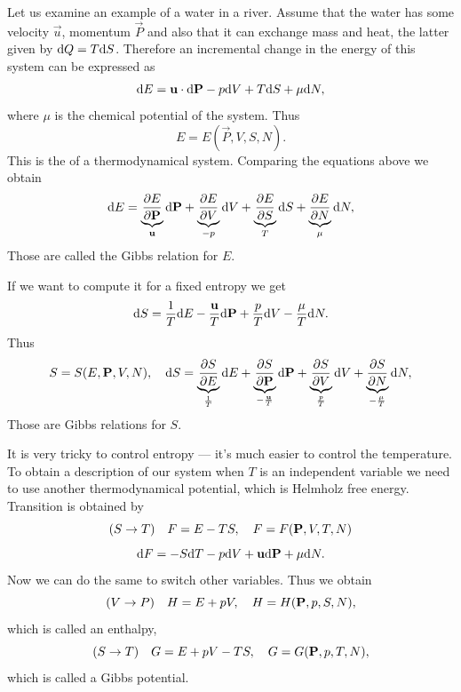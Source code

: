   Let us examine an example of a water in a river.
  Assume that the water has some velocity $\vec {u}$, momentum $\vec{P}$ and also that it can 
  exchange mass and heat, the latter given by $\mathrm{d} Q = T \mathrm{d} S$.
  Therefore an incremental change in the energy of this system can be expressed as
  \begin{displaymath}
    \mathrm{d} E = \mathbf{u} \cdot \mathrm{d} \mathbf{P} - p \mathrm{d} V + T \mathrm{d} S + \mu \mathrm{d} N,
  \end{displaymath}
  where $\mu$ is the chemical potential of the system.
  Thus
  \begin{displaymath}
    E = E(\vec P, V, S, N).
  \end{displaymath}
  This is the  of a thermodynamical system.
  Comparing the equations above we obtain
  \begin{displaymath}
    \mathrm{d} E = \underbrace{\frac{\partial E}{\partial \mathbf{P}}}_{\mathbf{u}} \mathrm{d} \mathbf{P} + \underbrace{\frac{\partial E}{\partial V}}_{- p} \mathrm{d} V 
    + \underbrace{\frac{\partial E}{\partial S}}_{T} \mathrm{d} S + \underbrace{\frac{\partial E}{\partial N}}_{\mu} \mathrm{d} N,
  \end{displaymath} %
  Those are called the Gibbs relation for $E$.

  If we want to compute it for a fixed entropy we get
  \begin{displaymath}
    \mathrm{d} S = \frac{1}{T} \mathrm{d} E - \frac{\mathbf{u}}{T} \mathrm{d} \mathbf{P} + \frac{p}{T} \mathrm{d} V - \frac{\mu}{T} \mathrm{d} N.
  \end{displaymath}
  Thus
  \begin{displaymath}
    S = S(E, \mathbf{P}, V, N), \quad
    \mathrm{d} S = \underbrace{\frac{\partial S}{\partial E}}_{\frac{1}{T}} \mathrm{d} E + \underbrace{\frac{\partial S}{\partial \mathbf{P}}}_{- \frac{\mathbf{u}}{T}} \mathrm{d} \mathbf{P} 
    + \underbrace{\frac{\partial S}{\partial V}}_{\frac{p}{T}} \mathrm{d} V + \underbrace{\frac{\partial S}{\partial N}}_{- \frac{\mu}{T}} \mathrm{d} N,
  \end{displaymath}
  Those are Gibbs relations for $S$.

  It is very tricky to control entropy --- it's much easier to control the temperature.
  To obtain a description of our system when $T$ is an independent variable we need to use another thermodynamical potential,
  which is Helmholz free energy.
  Transition is obtained by
  \begin{displaymath}
    (S \rightarrow T) \quad F = E - TS, \quad F = F(\mathbf{P}, V, T, N)
  \end{displaymath}
  \begin{displaymath}
    \mathrm{d} F = - S \mathrm{d} T - p \mathrm{d} V  + \mathbf{u} \mathrm{d} \mathbf{P}  + \mu \mathrm{d} N.
  \end{displaymath}
  Now we can do the same to switch other variables. Thus we obtain
  \begin{displaymath}
    (V \rightarrow P) \quad H = E + p V, \quad H = H(\mathbf{P}, p, S, N),
  \end{displaymath}
  which is called an enthalpy,
  \begin{displaymath}
    (S \rightarrow T) \quad G = E + pV - TS, \quad G = G(\mathbf{P}, p , T, N),
  \end{displaymath}
  which is called a Gibbs potential.

